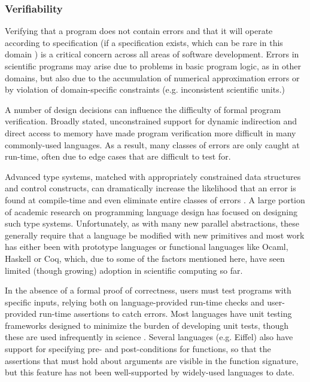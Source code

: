 \subsubsection{Verifiability}\label{verifiability}
Verifying that a program does not contain errors and that it will operate according to specification (if a specification exists, which can be rare in this domain \cite{oai:open.ac.uk.OAI2:17673}) is a critical concern across all areas of software development. Errors in scientific programs may arise due to problems in basic program logic, as in other domains, but also due to the accumulation of  numerical approximation errors or by violation of domain-specific constraints (e.g. inconsistent scientific units.)

A number of design decisions can influence the difficulty of formal program verification. Broadly stated, unconstrained support for dynamic indirection and direct access to memory have made program verification more difficult in many commonly-used languages. As a result, many classes of errors are only caught at run-time, often due to edge cases that are difficult to test for.

Advanced type systems, matched with appropriately constrained data structures and control constructs, can dramatically increase the likelihood that an error is found at compile-time and even eliminate entire classes of errors \cite{tapl}. A large portion of academic research on programming language design has focused on designing such type systems. Unfortunately, as with many new parallel abstractions, these generally require that a language be modified with new primitives and most work has either been with prototype languages or functional languages like Ocaml, Haskell or Coq, which, due to some of the factors mentioned here, have seen  limited (though growing) adoption in scientific computing so far.

In the absence of a formal proof of correctness, users must test programs with specific inputs, relying both on language-provided run-time checks and user-provided run-time assertions to catch errors. Most languages have unit testing frameworks designed to minimize the burden of developing unit tests, though these are used infrequently in science \cite{oai:open.ac.uk.OAI2:17673}\cite{hannay2009scientists}. Several languages (e.g. Eiffel) also have support for specifying pre- and post-conditions for functions, so that the assertions that must hold about arguments are visible in the function signature, but this feature has not been well-supported by widely-used languages to date.

